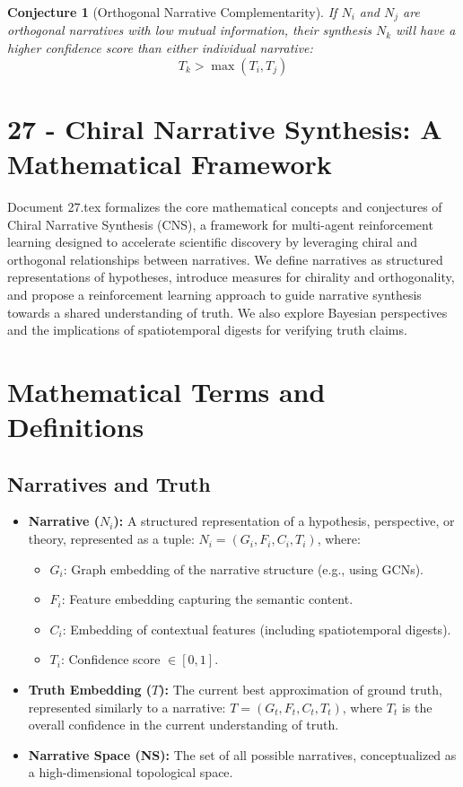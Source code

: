 \documentclass[12pt, a4paper]{article}
\newtheorem{conjecture}{Conjecture}
\begin{document}
\begin{conjecture}[Orthogonal Narrative Complementarity]
If $N_i$ and $N_j$ are orthogonal narratives with low mutual information, their synthesis $N_k$ will have a higher confidence score than either individual narrative:
\[
T_k > \max(T_i, T_j)
\]
\end{conjecture}








\section{27 - Chiral Narrative Synthesis: A Mathematical Framework}


Document 27.tex formalizes the core mathematical concepts and conjectures of Chiral Narrative Synthesis (CNS), a framework for multi-agent reinforcement learning designed to accelerate scientific discovery by leveraging chiral and orthogonal relationships between narratives.  We define narratives as structured representations of hypotheses, introduce measures for chirality and orthogonality, and propose a reinforcement learning approach to guide narrative synthesis towards a shared understanding of truth.  We also explore Bayesian perspectives and the implications of spatiotemporal digests for verifying truth claims.


\section{Mathematical Terms and Definitions}

\subsection{Narratives and Truth}

\begin{itemize}
    \item \textbf{Narrative ($N_i$): } A structured representation of a hypothesis, perspective, or theory, represented as a tuple: $N_i = (G_i, F_i, C_i, T_i)$, where:
        \begin{itemize}
            \item $G_i$: Graph embedding of the narrative structure (e.g., using GCNs).
            \item $F_i$: Feature embedding capturing the semantic content.
            \item $C_i$: Embedding of contextual features (including spatiotemporal digests).
            \item $T_i$: Confidence score $\in [0, 1]$.
        \end{itemize}
    \item \textbf{Truth Embedding ($T$): }  The current best approximation of ground truth, represented similarly to a narrative: $T = (G_t, F_t, C_t, T_t)$, where $T_t$ is the overall confidence in the current understanding of truth.
    \item \textbf{Narrative Space (NS): } The set of all possible narratives, conceptualized as a high-dimensional topological space.
\end{itemize}
\end{document}
